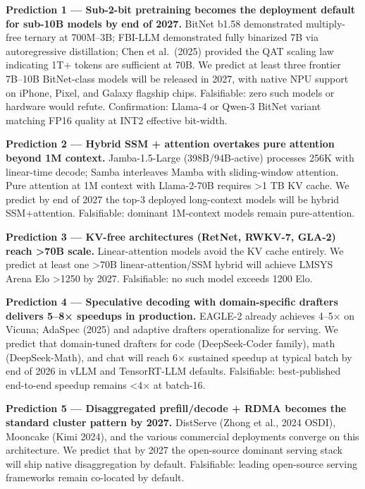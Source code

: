 \documentclass{article}
\begin{document}
\textbf{Prediction 1 --- Sub-2-bit pretraining becomes the deployment default for sub-10B models by end of 2027.} BitNet b1.58 \citep{ma20242024} demonstrated multiply-free ternary at 700M--3B; FBI-LLM \citep{ma20242024} demonstrated fully binarized 7B via autoregressive distillation; Chen et al.~(2025) provided the QAT scaling law indicating 1T+ tokens are sufficient at 70B. We predict at least three frontier 7B--10B BitNet-class models will be released in 2027, with native NPU support on iPhone, Pixel, and Galaxy flagship chips. Falsifiable: zero such models or hardware would refute. Confirmation: Llama-4 or Qwen-3 BitNet variant matching FP16 quality at INT2 effective bit-width.

\textbf{Prediction 2 --- Hybrid SSM + attention overtakes pure attention beyond 1M context.} Jamba-1.5-Large (398B/94B-active) processes 256K with linear-time decode; Samba interleaves Mamba with sliding-window attention. Pure attention at 1M context with Llama-2-70B requires \textgreater1 TB KV cache. We predict by end of 2027 the top-3 deployed long-context models will be hybrid SSM+attention. Falsifiable: dominant 1M-context models remain pure-attention.

\textbf{Prediction 3 --- KV-free architectures (RetNet, RWKV-7, GLA-2) reach \textgreater70B scale.} Linear-attention models avoid the KV cache entirely. We predict at least one \textgreater70B linear-attention/SSM hybrid will achieve LMSYS Arena Elo \textgreater1250 by 2027. Falsifiable: no such model exceeds 1200 Elo.

\textbf{Prediction 4 --- Speculative decoding with domain-specific drafters delivers 5--8× speedups in production.} EAGLE-2 already achieves 4--5× on Vicuna; AdaSpec (2025) and adaptive drafters \citep{liu2025adropinsolutionfor} operationalize for serving. We predict that domain-tuned drafters for code (DeepSeek-Coder family), math (DeepSeek-Math), and chat will reach 6× sustained speedup at typical batch by end of 2026 in vLLM and TensorRT-LLM defaults. Falsifiable: best-published end-to-end speedup remains \textless4× at batch-16.

\textbf{Prediction 5 --- Disaggregated prefill/decode + RDMA becomes the standard cluster pattern by 2027.} DistServe (Zhong et al., 2024 OSDI), Mooncake (Kimi 2024), and the various commercial deployments converge on this architecture. We predict that by 2027 the open-source dominant serving stack will ship native disaggregation by default. Falsifiable: leading open-source serving frameworks remain co-located by default.
\end{document}
